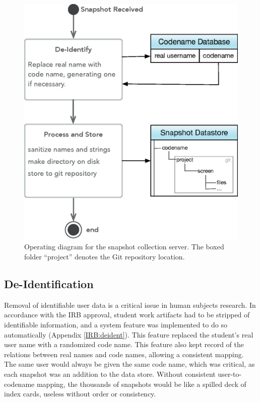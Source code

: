 \begin{figure}
  \centering
      \includegraphics[width=\textwidth]{diagrams/server-operation}
  \caption[Server Operating Diagram]{Operating diagram for the snapshot collection server. The boxed folder ``project'' denotes the Git repository location.}
  \label{fig:server-process}
\end{figure}


\subsection{De-Identification}
\label{sec:deident}
Removal of identifiable user data is a critical issue in human subjects research. In accordance with the IRB approval, student work artifacts had to be stripped of identifiable information, and a system feature was implemented to do so automatically (Appendix \ref{IRB:deident}). This feature replaced the student's real user name with a randomized code name. This feature also kept record of the relations between real names and code names, allowing a consistent mapping. The same user would always be given the same code name, which was critical, as each snapshot was an addition to the data store. Without consistent user-to-codename mapping, the thousands of snapshots would be like a spilled deck of index cards, useless without order or consistency. 

